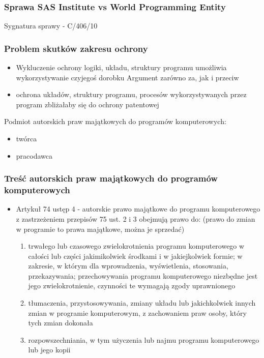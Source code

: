 \documentclass[12pt,a4paper]{article}
\begin{document}
\subsubsection{Sprawa SAS Institute vs World Programming Entity}
Sygnatura sprawy - C/406/10

\subsubsection{Problem skutków zakresu ochrony}
\begin{itemize}
\item Wykluczenie ochrony logiki, układu, struktury programu umożliwia wykorzystywanie czyjegoś dorobku
	\subitem * Argument zarówno za, jak i przeciw
\item ochrona układów, struktury programu, procesów wykorzystywanych przez program zbliżałaby się do ochrony patentowej
\end{itemize}

Podmiot autorskich praw majątkowych do programów komputerowych:
\begin{itemize}
\item twórca
\item pracodawca
\end{itemize}

\subsubsection{Treść autorskich praw majątkowych do programów komputerowych}
\begin{itemize}
	\item Artykuł 74 ustęp 4 - autorskie prawo majątkowe do programu komputerowego z zastrzeżeniem przepisów 75 ust. 2 i 3 obejmują prawo do: (prawo do zmian w programie to prawa majątkowe, można je sprzedać)
		\begin{enumerate}
			\item trwałego lub czasowego zwielokrotnienia programu komputerowego w całości lub części jakimikolwiek środkami i w jakiejkolwiek formie; w zakresie, w którym dla wprowadzenia, wyświetlenia, stosowania, przekazywania; przechowywania programu komputerowego niezbędne jest jego zwielokrotnienie, czynności te wymagają zgody uprawnionego
			\item tłumaczenia, przystosowywania, zmiany układu lub jakichkolwiek innych zmian w programie komputerowym, z zachowaniem praw osoby, który tych zmian dokonała
			\item rozpowszechniania, w tym użyczenia lub najmu programu komputerowego lub jego kopii
		\end{enumerate}
\end{itemize}
\end{document}
